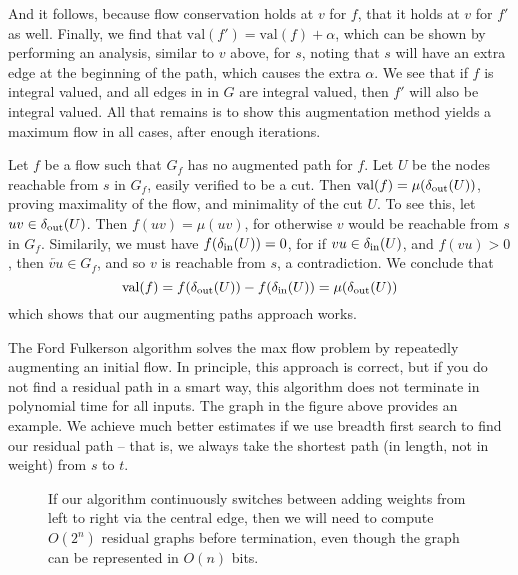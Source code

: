%
And it follows, because flow conservation holds at $v$ for $f$, that it holds at $v$ for $f'$ as well. Finally, we find that $\text{val}(f') = \text{val}(f) + \alpha$, which can be shown by performing an analysis, similar to $v$ above, for $s$, noting that $s$ will have an extra edge at the beginning of the path, which causes the extra $\alpha$. We see that if $f$ is integral valued, and all edges in in $G$ are integral valued, then $f'$ will also be integral valued. All that remains is to show this augmentation method yields a maximum flow in all cases, after enough iterations.

Let $f$ be a flow such that $G_f$ has no augmented path for $f$. Let $U$ be the nodes reachable from $s$ in $G_f$, easily verified to be a cut. Then $\text{val}(f) = \mu(\operatorname{\delta_{\text{out}}}(U))$, proving maximality of the flow, and minimality of the cut $U$. To see this, let $uv \in \operatorname{\delta_{\text{out}}}(U)$. Then $f(uv) = \mu(uv)$, for otherwise $v$ would be reachable from $s$ in $G_f$. Similarily, we must have $f(\operatorname{\delta_{\text{in}}}(U)) = 0$, for if $vu \in \operatorname{\delta_{\text{in}}}(U)$, and $f(vu) > 0$, then $\overleftarrow{vu} \in G_f$, and so $v$ is reachable from $s$, a contradiction. We conclude that
%
\[ \text{val}(f) = f(\operatorname{\delta_{\text{out}}}(U)) - f(\operatorname{\delta_{\text{in}}}(U)) = \mu(\operatorname{\delta_{\text{out}}}(U)) \]
%
which shows that our augmenting paths approach works.

The Ford Fulkerson algorithm solves the max flow problem by repeatedly augmenting an initial flow. In principle, this approach is correct, but if you do not find a residual path in a smart way, this algorithm does not terminate in polynomial time for all inputs. The graph in the figure above provides an example. We achieve much better estimates if we use breadth first search to find our residual path -- that is, we always take the shortest path (in length, not in weight) from $s$ to $t$.

\begin{figure}
\begin{center}
\end{center}
\caption{If our algorithm continuously switches between adding weights from left to right via the central edge, then we will need to compute $O(2^n)$ residual graphs before termination, even though the graph can be represented in $O(n)$ bits.}
\end{figure}

